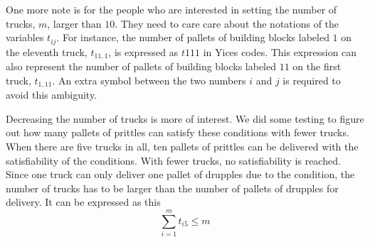 \documentclass[11pt]{article}
\begin{document}
One more note is for the people who are interested in setting the number of trucks, $m$, larger than $10$. They need to care care about the notations of the variables $t_{ij}$. For instance, the number of pallets of building blocks labeled $1$ on the eleventh truck, $t_{11,1}$, is expressed as  $t111$ in Yices codes. This expression can also represent the number of pallets of building blocks labeled $11$ on the first truck, $t_{1,11}$. An extra symbol between the two numbers $i$ and $j$ is required to avoid this ambiguity.

Decreasing the number of trucks is more of interest. We did some testing to figure out how many pallets of prittles can satisfy these conditions with fewer trucks. When there are five trucks in all, ten pallets of prittles can be delivered with the satisfiability of the conditions. With fewer trucks, no satisfiability is reached. Since one truck can only deliver one pallet of drupples due to the condition, the number of trucks has to be larger than the number of pallets of drupples for delivery. It can be expressed as this
\[ \sum_{i=1}^m t_{i5}\leq m \]





\end{document}
